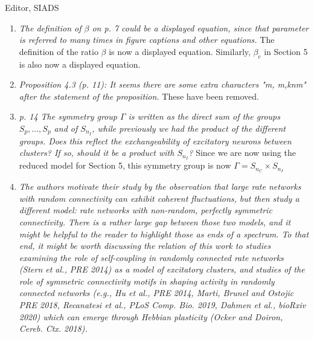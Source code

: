 \documentclass[11pt]{letter}
\begin{document}
\begin{letter}{Editor, SIADS}
\begin{enumerate}
\vspace{4mm}

\item \emph{The definition of $\beta$ on p. 7 could be a displayed equation, since that parameter is referred to many times in figure captions and other equations. }
The definition of the ratio $\beta$ is now a displayed equation. Similarly, $\beta_c$ in Section 5 is also now a displayed equation.
\vspace{4mm} 

\item \emph{Proposition 4.3 (p. 11): It seems there are some extra characters "m, m,knm" after the statement of the proposition. }
These have been removed.
\vspace{4mm} 

\item \emph{p. 14 The symmetry group $\Gamma$ is written as the direct sum of the groups $S_p, \ldots, S_p$ and of $S_{n_I}$, while previously we had the product of the different groups. Does this reflect the exchangeability of excitatory neurons between clusters? If so, should it be a product with $S_{n_I}$? }
Since we are now using the reduced model for Section 5, this symmetry group is now $\Gamma = S_{n_C} \times S_{n_I}$
\vspace{4mm} 

\item \emph{The authors motivate their study by the observation that large rate networks with random connectivity can exhibit coherent fluctuations, but then study a different model: rate networks with non-random, perfectly symmetric connectivity. There is a rather large gap between those two models, and it might be helpful to the reader to highlight those as ends of a spectrum. To that end, it might be worth discussing the relation of this work to studies examining the role of self-coupling in randomly connected rate networks (Stern et al., PRE 2014) as a model of excitatory clusters, and studies of the role of symmetric connectivity motifs in shaping activity in randomly connected networks (e.g., Hu et al., PRE 2014, Marti, Brunel and Ostojic PRE 2018, Recanatesi et al., PLoS Comp. Bio. 2019, Dahmen et al., bioRxiv 2020) which can emerge through Hebbian plasticity (Ocker and Doiron, Cereb. Ctx. 2018). }
\vspace{4mm} 

\end{enumerate}


\end{letter}
\end{document}
